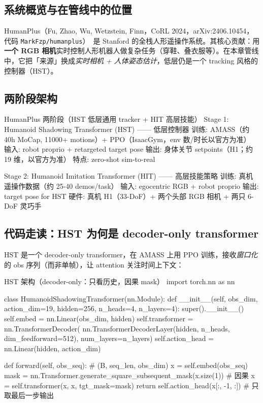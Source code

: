 \subsection{系统概览与在管线中的位置}
\label{sec:rlmc-mm-humanplus-pos}

HumanPlus（Fu, Zhao, Wu, Wetzstein, Finn，CoRL 2024，arXiv:2406.10454，代码 \texttt{MarkFzp/humanplus}）\,\cite{fu2024humanplus} 是 Stanford 的全栈人形遥操作系统。其核心贡献：用\textbf{一个 RGB 相机}实时控制人形机器人做复杂任务（穿鞋、叠衣服等）。在本章管线中，它把「来源」换成\emph{实时相机 + 人体姿态估计}，低层仍是一个 tracking 风格的控制器（HST）。

\subsection{两阶段架构}
\label{sec:rlmc-mm-humanplus-arch}

\begin{codebox}{HumanPlus 两阶段（HST 低层通用 tracker + HIT 高层技能）}
Stage 1: Humanoid Shadowing Transformer (HST) —— 低层控制器
  训练: AMASS（约 40h MoCap, 11000+ motions）+ PPO（IsaacGym，env 数/时长以官方为准）
  输入: robot proprio + retargeted target pose
  输出: 身体关节 setpoints（H1；约 19 维，以官方为准）
  特点: zero-shot sim-to-real

Stage 2: Humanoid Imitation Transformer (HIT) —— 高层技能策略
  训练: 真机遥操作数据（约 25-40 demos/task）
  输入: egocentric RGB + robot proprio
  输出: target pose for HST
  硬件: 真机 H1（33-DoF）+ 两个头部 RGB 相机 + 两只 6-DoF 灵巧手
\end{codebox}

\subsection{代码走读：HST 为何是 decoder-only transformer}
\label{sec:rlmc-mm-humanplus-hst}

HST 是一个 decoder-only transformer，在 AMASS 上用 PPO 训练，接收\emph{窗口化}的 obs 序列（而非单帧），让 attention 关注时间上下文：

\begin{codebox}[Python]{HST 架构（decoder-only：只看历史，因果 mask）}
import torch.nn as nn

class HumanoidShadowingTransformer(nn.Module):
    def __init__(self, obs_dim, action_dim=19, hidden=256, n_heads=4, n_layers=4):
        super().__init__()
        self.embed = nn.Linear(obs_dim, hidden)
        self.transformer = nn.TransformerDecoder(
            nn.TransformerDecoderLayer(hidden, n_heads, dim_feedforward=512),
            num_layers=n_layers)
        self.action_head = nn.Linear(hidden, action_dim)

    def forward(self, obs_seq):              # (B, seq_len, obs_dim)
        x = self.embed(obs_seq)
        mask = nn.Transformer.generate_square_subsequent_mask(x.size(1))  # 因果
        x = self.transformer(x, x, tgt_mask=mask)
        return self.action_head(x[:, -1, :]) # 只取最后一步输出
\end{codebox}

